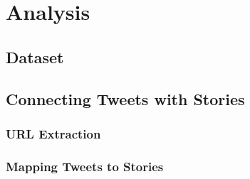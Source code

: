  \chapter{Analysis}
 \section{Dataset}





\section{Connecting Tweets with Stories}

 \subsection{URL Extraction}
 \subsection{Mapping Tweets to Stories}
 

